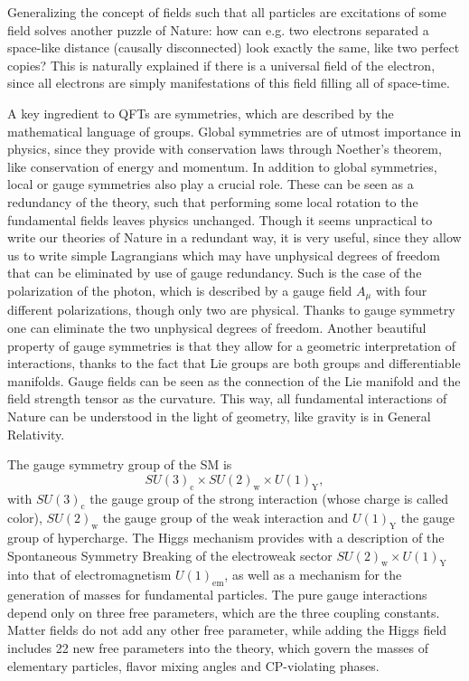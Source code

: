Generalizing the concept of fields such that all particles are excitations of some field solves another puzzle of Nature: how can e.g. two electrons separated a space-like distance (causally disconnected) look exactly the same, like two perfect copies? This is naturally explained if there is a universal field of the electron, since all electrons are simply manifestations of this field filling all of space-time. 

A key ingredient to QFTs are symmetries, which are described by the mathematical language of groups. Global symmetries are of utmost importance in physics, since they provide with conservation laws through Noether's theorem, like conservation of energy and momentum. In addition to global symmetries, local or gauge symmetries also play a crucial role. These can be seen as a redundancy of the theory, such that performing some local rotation to the fundamental fields leaves physics unchanged. Though it seems unpractical to write our theories of Nature in a redundant way, it is very useful, since they allow us to write simple Lagrangians which may have unphysical degrees of freedom that can be eliminated by use of gauge redundancy. Such is the case of the polarization of the photon, which is described by a gauge field $A_{\mu}$ with four different polarizations, though only two are physical. Thanks to gauge symmetry one can eliminate the two unphysical degrees of freedom. Another beautiful property of gauge symmetries is that they allow for a geometric interpretation of interactions, thanks to the fact that Lie groups are both groups and differentiable manifolds. Gauge fields can be seen as the connection of the Lie manifold and the field strength tensor as the curvature. This way, all fundamental interactions of Nature can be understood in the light of geometry, like gravity is in General Relativity.

The gauge symmetry group of the SM is
\begin{equation*}
SU(3)_{\textrm{c}}\times SU(2)_{\textrm{w}}\times U(1)_{\textrm{Y}},
\end{equation*}
with $SU(3)_{\textrm{c}}$ the gauge group of the strong interaction (whose charge is called color), $SU(2)_{\textrm{w}}$ the gauge group of the weak interaction and $U(1)_{\textrm{Y}}$ the gauge group of hypercharge. The Higgs mechanism provides with a description of the Spontaneous Symmetry Breaking of the electroweak sector $SU(2)_{\textrm{w}}\times U(1)_{\textrm{Y}}$ into that of electromagnetism $U(1)_{\textrm{em}}$, as well as a mechanism for the generation of masses for fundamental particles. The pure gauge interactions depend only on three free parameters, which are the three coupling constants. Matter fields do not add any other free parameter, while adding the Higgs field includes 22 new free parameters into the theory, which govern the masses of elementary particles, flavor mixing angles and CP-violating phases.

